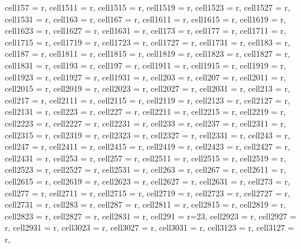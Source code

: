 \begin{table*}[ht!]
{\begin{tblr}
{  cell{15}{7} = {r},
  cell{15}{11} = {r},
  cell{15}{15} = {r},
  cell{15}{19} = {r},
  cell{15}{23} = {r},
  cell{15}{27} = {r},
  cell{15}{31} = {r},
  cell{16}{3} = {r},
  cell{16}{7} = {r},
  cell{16}{11} = {r},
  cell{16}{15} = {r},
  cell{16}{19} = {r},
  cell{16}{23} = {r},
  cell{16}{27} = {r},
  cell{16}{31} = {r},
  cell{17}{3} = {r},
  cell{17}{7} = {r},
  cell{17}{11} = {r},
  cell{17}{15} = {r},
  cell{17}{19} = {r},
  cell{17}{23} = {r},
  cell{17}{27} = {r},
  cell{17}{31} = {r},
  cell{18}{3} = {r},
  cell{18}{7} = {r},
  cell{18}{11} = {r},
  cell{18}{15} = {r},
  cell{18}{19} = {r},
  cell{18}{23} = {r},
  cell{18}{27} = {r},
  cell{18}{31} = {r},
  cell{19}{3} = {r},
  cell{19}{7} = {r},
  cell{19}{11} = {r},
  cell{19}{15} = {r},
  cell{19}{19} = {r},
  cell{19}{23} = {r},
  cell{19}{27} = {r},
  cell{19}{31} = {r},
  cell{20}{3} = {r},
  cell{20}{7} = {r},
  cell{20}{11} = {r},
  cell{20}{15} = {r},
  cell{20}{19} = {r},
  cell{20}{23} = {r},
  cell{20}{27} = {r},
  cell{20}{31} = {r},
  cell{21}{3} = {r},
  cell{21}{7} = {r},
  cell{21}{11} = {r},
  cell{21}{15} = {r},
  cell{21}{19} = {r},
  cell{21}{23} = {r},
  cell{21}{27} = {r},
  cell{21}{31} = {r},
  cell{22}{3} = {r},
  cell{22}{7} = {r},
  cell{22}{11} = {r},
  cell{22}{15} = {r},
  cell{22}{19} = {r},
  cell{22}{23} = {r},
  cell{22}{27} = {r},
  cell{22}{31} = {r},
  cell{23}{3} = {r},
  cell{23}{7} = {r},
  cell{23}{11} = {r},
  cell{23}{15} = {r},
  cell{23}{19} = {r},
  cell{23}{23} = {r},
  cell{23}{27} = {r},
  cell{23}{31} = {r},
  cell{24}{3} = {r},
  cell{24}{7} = {r},
  cell{24}{11} = {r},
  cell{24}{15} = {r},
  cell{24}{19} = {r},
  cell{24}{23} = {r},
  cell{24}{27} = {r},
  cell{24}{31} = {r},
  cell{25}{3} = {r},
  cell{25}{7} = {r},
  cell{25}{11} = {r},
  cell{25}{15} = {r},
  cell{25}{19} = {r},
  cell{25}{23} = {r},
  cell{25}{27} = {r},
  cell{25}{31} = {r},
  cell{26}{3} = {r},
  cell{26}{7} = {r},
  cell{26}{11} = {r},
  cell{26}{15} = {r},
  cell{26}{19} = {r},
  cell{26}{23} = {r},
  cell{26}{27} = {r},
  cell{26}{31} = {r},
  cell{27}{3} = {r},
  cell{27}{7} = {r},
  cell{27}{11} = {r},
  cell{27}{15} = {r},
  cell{27}{19} = {r},
  cell{27}{23} = {r},
  cell{27}{27} = {r},
  cell{27}{31} = {r},
  cell{28}{3} = {r},
  cell{28}{7} = {r},
  cell{28}{11} = {r},
  cell{28}{15} = {r},
  cell{28}{19} = {r},
  cell{28}{23} = {r},
  cell{28}{27} = {r},
  cell{28}{31} = {r},
  cell{29}{1} = {r=23}{},
  cell{29}{23} = {r},
  cell{29}{27} = {r},
  cell{29}{31} = {r},
  cell{30}{23} = {r},
  cell{30}{27} = {r},
  cell{30}{31} = {r},
  cell{31}{23} = {r},
  cell{31}{27} = {r},
}
\end{tblr}}
\end{table*}
